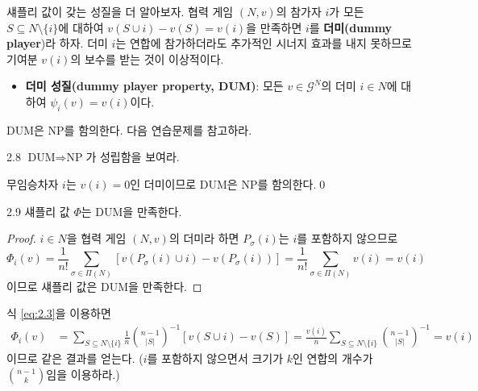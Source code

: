 \documentclass{article}
\numberwithin{equation}{section}
\begin{document}
섀플리 값이 갖는 성질을 더 알아보자. 협력 게임 $(N,v)$의 참가자 $i$가 모든 $S\subseteq N\setminus\{i\}$에 대하여 $v(S\cup i)-v(S)=v(i)$을 만족하면 $i$를 \textbf{더미(dummy player})라 하자. 더미 $i$는 연합에 참가하더라도 추가적인 시너지 효과를 내지 못하므로 기여분 $v(i)$의 보수를 받는 것이 이상적이다.
\begin{itemize}
	\item \textbf{더미 성질(dummy player property, DUM)}: 모든 $v\in\mathcal G^N$의 더미 $i\in N$에 대하여 $\psi_i(v)=v(i)$이다.
\end{itemize}

DUM은 NP를 함의한다. 다음 연습문제를 참고하라.

\begin{prob}{}{2.8}
	$\text{DUM}\Longrightarrow\text{NP}$가 성립함을 보여라.
\end{prob}

\begin{sol}
	무임승차자 $i$는 $v(i)=0$인 더미이므로 DUM은 NP를 함의한다.\qed
\end{sol}

\newpage
\begin{thm}{}{2.9}
	섀플리 값 $\Phi$는 DUM을 만족한다. 
\end{thm}

\begin{proof}
	$i\in N$을 협력 게임 $(N,v)$의 더미라 하면 $P_\sigma(i)$는 $i$를 포함하지 않으므로
	\[
		\Phi_i(v)=\frac{1}{n!}\sum_{\sigma\in\Pi(N)}[v(P_\sigma(i)\cup i)-v(P_\sigma(i))]=\frac{1}{n!}\sum_{\sigma\in\Pi(N)}v(i)=v(i)
	\]
	이므로 섀플리 값은 DUM을 만족한다.
\end{proof}

\begin{remark}
	식 \ref{eq:2.3}을 이용하면
	\[
		\begin{aligned}
			\Phi_i(v)&=\sum_{S\subseteq N\setminus\{i\}}\frac{1}{n}\binom{n-1}{\vert S\vert}^{-1}[v(S\cup i)-v(S)]=\frac{v(i)}{n}\sum_{S\subseteq N\setminus\{i\}}\binom{n-1}{\vert S\vert}^{-1}=v(i)
		\end{aligned}
	\]
	이므로 같은 결과를 얻는다. ($i$를 포함하지 않으면서 크기가 $k$인 연합의 개수가 $\binom{n-1}{k}$임을 이용하라.)
\end{remark}
\end{document}
